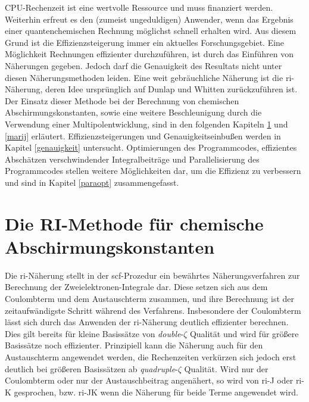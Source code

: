 CPU-Rechenzeit ist eine wertvolle Ressource und muss finanziert werden. Weiterhin erfreut es den (zumeist ungeduldigen) Anwender, wenn das Ergebnis einer quantenchemischen Rechnung möglichst schnell erhalten wird. Aus diesem Grund ist die Effizienzsteigerung immer ein aktuelles Forschungsgebiet. Eine Möglichkeit Rechnungen effizienter durchzuführen, ist durch das Einführen von Näherungen gegeben. Jedoch darf die Genauigkeit des Resultats nicht unter diesen Näherungsmethoden leiden. Eine weit gebräuchliche Näherung ist die \acf{ri}-Näherung\supercite{vahtras1993integral}, deren Idee ursprünglich auf Dunlap\supercite{dunlap1979some} und Whitten\supercite{whitten1973coulombic} zurückzuführen ist. Der Einsatz dieser Methode bei der Berechnung von chemischen Abschirmungskonstanten, sowie eine weitere Beschleunigung durch die Verwendung einer Multipolentwicklung, sind in den folgenden Kapiteln \ref{ri} und \ref{marij} erläutert. Effizienzsteigerungen und Genauigkeitseinbußen werden in Kapitel \ref{genauigkeit} untersucht. Optimierungen des Programmcodes, effizientes Abschätzen verschwindender Integralbeiträge und Parallelisierung des Programmcodes stellen weitere Möglichkeiten dar, um die Effizienz zu verbessern und sind in Kapitel \ref{paraopt} zusammengefasst. 

\section{Die RI-Methode für chemische Abschirmungskonstanten}\label{ri}
Die \ac{ri}-Näherung stellt in der \ac{scf}-Prozedur ein bewährtes Näherungsverfahren zur Berechnung der Zweielektronen-Integrale dar. Diese setzen sich aus dem Coulombterm und dem Austauschterm zusammen, und ihre Berechnung ist der zeitaufwändigste Schritt während des Verfahrens. Insbesondere der Coulombterm lässt sich durch das Anwenden der \ac{ri}-Näherung deutlich effizienter berechnen. Dies gilt bereits für kleine Basissätze von \textit{double}-$\zeta$ Qualität und wird für größere Basissätze noch effizienter. Prinzipiell kann die Näherung auch für den Austauschterm angewendet werden, die Rechenzeiten verkürzen sich jedoch erst deutlich bei größeren Basissätzen ab \textit{quadruple}-$\zeta$ Qualität. Wird nur der Coulombterm oder nur der Austauschbeitrag angenähert, so wird von \ac{ri}-J oder \ac{ri}-K gesprochen, bzw. \ac{ri}-JK wenn die Näherung für beide Terme angewendet wird. 

